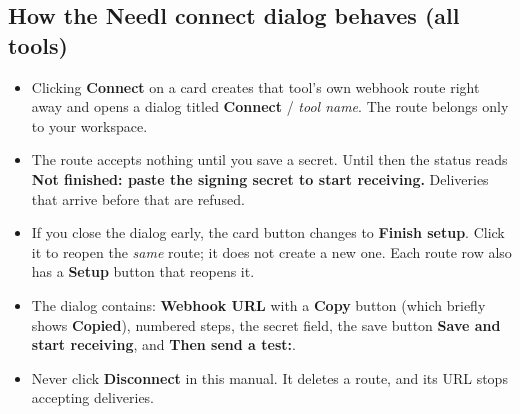 \documentclass[11pt,a4paper]{article}
\newcommand{\ui}[1]{\textbf{#1}}
\begin{document}
\subsection{How the Needl connect dialog behaves (all tools)}
\begin{itemize}
\item Clicking \ui{Connect} on a card creates that tool's own webhook route right away and opens a dialog titled \ui{Connect} / \textit{tool name}. The route belongs only to your workspace.
\item The route accepts nothing until you save a secret. Until then the status reads \ui{Not finished: paste the signing secret to start receiving.} Deliveries that arrive before that are refused.
\item If you close the dialog early, the card button changes to \ui{Finish setup}. Click it to reopen the \emph{same} route; it does not create a new one. Each route row also has a \ui{Setup} button that reopens it.
\item The dialog contains: \ui{Webhook URL} with a \ui{Copy} button (which briefly shows \ui{Copied}), numbered steps, the secret field, the save button \ui{Save and start receiving}, and \ui{Then send a test:}.
\item Never click \ui{Disconnect} in this manual. It deletes a route, and its URL stops accepting deliveries.
\end{itemize}
\end{document}
